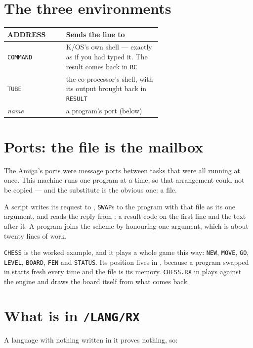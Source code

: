 \section{The three environments}
\begin{center}
\small
\begin{tabular}{@{}l >{\raggedright\arraybackslash}p{0.62\linewidth}@{}}
\toprule
\textbf{ADDRESS} & \textbf{Sends the line to} \\
\midrule
\texttt{COMMAND} & K/OS's own shell --- exactly as if you had typed it. The result comes back in \verb|RC| \\
\texttt{TUBE} & the co-processor's shell, with its output brought back in \verb|RESULT| \\
\emph{name} & a program's port (below) \\
\bottomrule
\end{tabular}
\end{center}

\section{Ports: the file is the mailbox}
The Amiga's ports were message ports between tasks that were all running
at once. This machine runs one program at a time, so that arrangement
could not be copied --- and the substitute is the obvious one: a file.

A script writes its request to , \verb|SWAP|s to
the program with that file as its one argument, and reads the reply from
: a result code on the first line and the text
after it. A program joins the scheme by honouring one argument, which is
about twenty lines of work.

\verb|CHESS| is the worked example, and it plays a whole game this way:
\verb|NEW|, \verb|MOVE|, \verb|GO|, \verb|LEVEL|, \verb|BOARD|,
\verb|FEN| and \verb|STATUS|. Its position lives in
, because a program swapped in starts fresh
every time and the file is its memory. \texttt{CHESS.RX} in
 plays against the engine and draws the board itself from
what comes back.

\section{What is in \texttt{/LANG/RX}}
A language with nothing written in it proves nothing, so:

